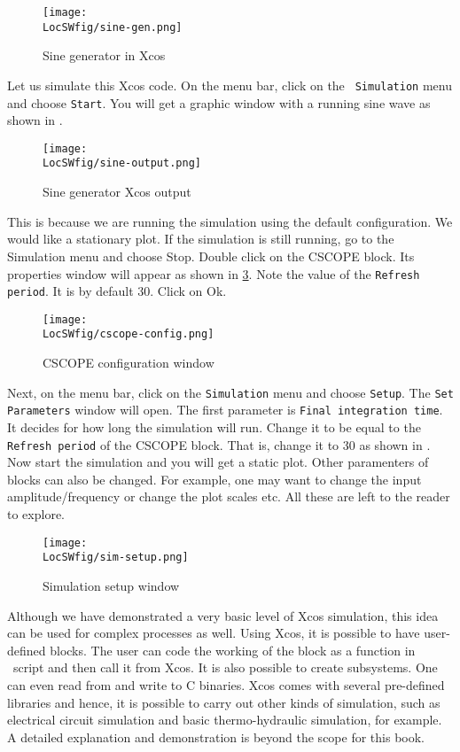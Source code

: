 \begin{figure}
      \centering
      \texttt{[image: \\LocSWfig/sine-gen.png]}
      \caption{Sine generator in Xcos}
      \label{sine-gen}
\end{figure}

Let us simulate this Xcos code. On the menu bar, click on the {\tt
            Simulation} menu and choose {\tt Start}. You will get a graphic
window with a running sine wave as shown in .

\begin{figure}
      \centering
      \texttt{[image: \\LocSWfig/sine-output.png]}
      \caption{Sine generator Xcos output}
      \label{sine-output}
\end{figure}

This is because we are running the simulation using the default
configuration.  We would like a stationary plot.  If the simulation is
still running, go to the Simulation menu and choose Stop.  Double
click on the CSCOPE block. Its properties window will appear as shown
in \ref{cscope-config}. Note the value of the {\tt Refresh period}. It
is by default 30. Click on Ok.

\begin{figure}
      \centering
      \texttt{[image: \\LocSWfig/cscope-config.png]}
      \caption{CSCOPE configuration window}
      \label{cscope-config}
\end{figure}

Next, on the menu bar, click on the {\tt Simulation} menu and choose
      {\tt Setup}. The {\tt Set Parameters} window will open. The first
parameter is {\tt Final integration time}. It decides for how long the
simulation will run. Change it to be equal to the {\tt Refresh period}
of the CSCOPE block.  That is, change it to 30 as shown in
. Now start the simulation and you will get a static
plot.  Other paramenters of blocks can also be changed. For example,
one may want to change the input amplitude/frequency or change the
plot scales etc. All these are left to the reader to explore.

\begin{figure}
      \centering
      \texttt{[image: \\LocSWfig/sim-setup.png]}
      \caption{Simulation setup window}
      \label{sim-setup}
\end{figure}

Although we have demonstrated a very basic level of Xcos simulation,
this idea can be used for complex processes as well.  Using Xcos, it
is possible to have user-defined blocks. The user can code the
working of the block as a function in \scilab\ script and then call it
from Xcos.  It is also possible to create subsystems.  
One can even read from and write to C binaries.  Xcos comes with
several pre-defined libraries and hence, it is possible to carry out
other kinds of simulation, such as electrical circuit simulation and
basic thermo-hydraulic simulation, for example.  A detailed
explanation and demonstration is beyond the scope for this book.

